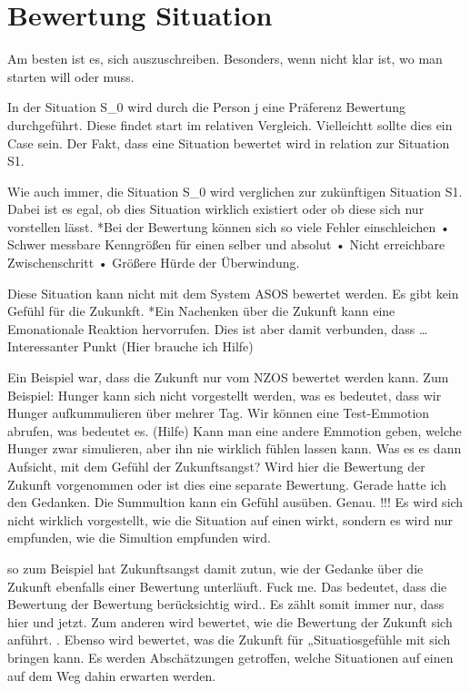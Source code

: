 \section{Bewertung Situation}

Am besten ist es, sich auszuschreiben. Besonders, wenn nicht klar ist, wo man starten will oder muss. 

In der Situation S_0 wird durch die Person j eine Präferenz Bewertung durchgeführt. Diese findet start im relativen Vergleich. Vielleichtt sollte dies ein Case sein. Der Fakt, dass eine Situation bewertet wird in relation zur Situation S1. 

Wie auch immer, die Situation S_0 wird verglichen zur zukünftigen Situation S1. Dabei ist es egal, ob dies Situation wirklich existiert oder ob diese sich nur vorstellen lässt. *Bei der Bewertung können sich so viele Fehler einschleichen
• Schwer messbare Kenngrößen für einen selber und absolut
• Nicht erreichbare Zwischenschritt
• Größere Hürde der Überwindung.

Diese Situation kann nicht mit dem System ASOS bewertet werden. Es gibt kein Gefühl für die Zukunkft. *Ein Nachenken über die Zukunft kann eine Emonationale Reaktion hervorrufen. Dies ist aber damit verbunden, dass … Interessanter Punkt (Hier brauche ich Hilfe)

Ein Beispiel war, dass die Zukunft nur vom NZOS bewertet werden kann. Zum Beispiel: Hunger kann sich nicht vorgestellt werden, was es bedeutet, dass wir Hunger aufkummulieren über mehrer Tag. Wir können eine Test-Emmotion abrufen, was bedeutet es.
(Hilfe) Kann man eine andere Emmotion geben, welche Hunger zwar simulieren, aber ihn nie wirklich fühlen lassen kann.
Was es es dann Aufsicht, mit dem Gefühl der Zukunftsangst? Wird hier die Bewertung der Zukunft vorgenommen oder ist dies eine separate Bewertung. Gerade hatte ich den Gedanken. 
Die Summultion kann ein Gefühl ausüben. Genau. !!! Es wird sich nicht wirklich vorgestellt, wie die Situation auf einen wirkt, sondern es wird nur empfunden, wie die Simultion empfunden wird. 

so zum Beispiel hat Zukunftsangst damit zutun, wie der Gedanke über die Zukunft ebenfalls einer Bewertung unterläuft. Fuck me. Das bedeutet, dass die Bewertung der Bewertung berücksichtig wird.. Es zählt somit immer nur, dass hier und jetzt. Zum anderen wird bewertet, wie die Bewertung der Zukunft sich anführt. . Ebenso wird bewertet, was die Zukunft für „Situatiosgefühle mit sich bringen kann. Es werden Abschätzungen getroffen, welche Situationen auf einen auf dem Weg dahin erwarten werden.

